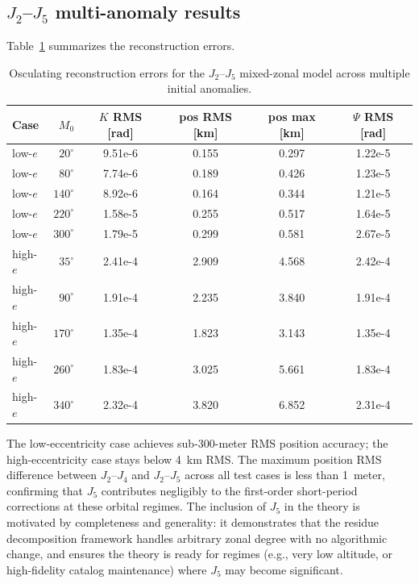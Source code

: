 \documentclass[11pt]{article}
\begin{document}
\subsection{$J_2$--$J_5$ multi-anomaly results}

Table~\ref{tab:j2j5_validation} summarizes the reconstruction errors.

\begin{table}[ht]
\centering
\begin{tabular}{@{}lrcccc@{}}
\toprule
Case & $M_0$ & $K$ RMS [rad] & pos RMS [km] & pos max [km] & $\Psi$ RMS [rad] \\
\midrule
low-$e$  & $20^\circ$  & 9.51e-6 & 0.155 & 0.297 & 1.22e-5 \\
low-$e$  & $80^\circ$  & 7.74e-6 & 0.189 & 0.426 & 1.23e-5 \\
low-$e$  & $140^\circ$ & 8.92e-6 & 0.164 & 0.344 & 1.21e-5 \\
low-$e$  & $220^\circ$ & 1.58e-5 & 0.255 & 0.517 & 1.64e-5 \\
low-$e$  & $300^\circ$ & 1.79e-5 & 0.299 & 0.581 & 2.67e-5 \\
high-$e$ & $35^\circ$  & 2.41e-4 & 2.909 & 4.568 & 2.42e-4 \\
high-$e$ & $90^\circ$  & 1.91e-4 & 2.235 & 3.840 & 1.91e-4 \\
high-$e$ & $170^\circ$ & 1.35e-4 & 1.823 & 3.143 & 1.35e-4 \\
high-$e$ & $260^\circ$ & 1.83e-4 & 3.025 & 5.661 & 1.83e-4 \\
high-$e$ & $340^\circ$ & 2.32e-4 & 3.820 & 6.852 & 2.31e-4 \\
\bottomrule
\end{tabular}
\caption{Osculating reconstruction errors for the $J_2$--$J_5$ mixed-zonal
model across multiple initial anomalies.}
\label{tab:j2j5_validation}
\end{table}

The low-eccentricity case achieves sub-300-meter RMS position accuracy; the
high-eccentricity case stays below 4~km RMS. The maximum position RMS
difference between $J_2$--$J_4$ and $J_2$--$J_5$ across all test cases is
less than 1~meter, confirming that $J_5$ contributes negligibly to the
first-order short-period corrections at these orbital regimes. The inclusion
of $J_5$ in the theory is motivated by completeness and generality: it
demonstrates that the residue decomposition framework handles arbitrary
zonal degree with no algorithmic change, and ensures the theory is ready
for regimes (e.g., very low altitude, or high-fidelity catalog maintenance)
where $J_5$ may become significant.
\end{document}
